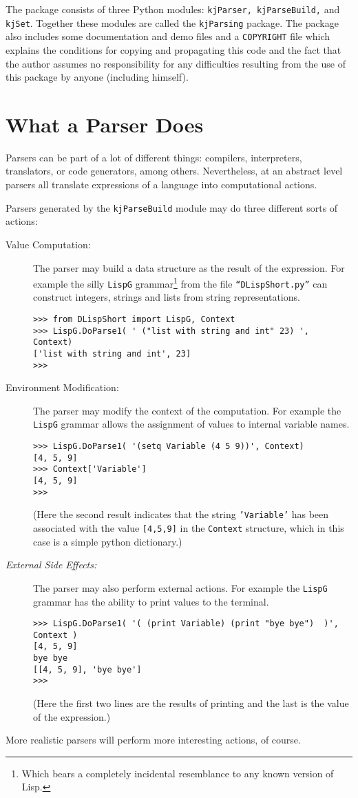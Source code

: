 The package consists of three Python modules:
{\tt kjParser, kjParseBuild,} and {\tt kjSet}.  Together these
modules are called the {\tt kjParsing} package.
The package also includes some documentation and demo
files and a {\tt COPYRIGHT} file which explains the
conditions for copying and propagating this code
and the fact that the author assumes no responsibility
for any difficulties resulting from the use of this
package by anyone (including himself).

\section{What a Parser Does}

Parsers can be part of a lot of different things:
compilers, interpreters, translators, or code generators,
among others.  Nevertheless, at an abstract level parsers
all translate expressions of a language into computational
actions.

Parsers generated by the {\tt kjParseBuild} module may do three
different sorts of actions: 
\begin{description}
\item[Value Computation:]
The parser may build a data structure
as the result of the expression.  For example the silly {\tt LispG}
grammar\footnote{Which
bears a completely incidental resemblance to any
known version of Lisp.}
from the file
{\tt ``DLispShort.py''} can construct integers, strings and
lists from string representations.
\begin{verbatim}
>>> from DLispShort import LispG, Context
>>> LispG.DoParse1( ' ("list with string and int" 23) ', Context)
['list with string and int', 23]
>>>
\end{verbatim}
\item[Environment Modification:]
The parser may modify the context of the computation.  For example
the {\tt LispG} grammar allows the assignment of values to internal
variable names.
\begin{verbatim}
>>> LispG.DoParse1( '(setq Variable (4 5 9))', Context)
[4, 5, 9]
>>> Context['Variable']
[4, 5, 9]
>>>
\end{verbatim}
(Here the second result indicates that the string {\tt 'Variable'}
has been associated with the value {\tt [4,5,9]} in
the {\tt Context} structure, which in this case is a simple
python dictionary.)
\item[\em External Side Effects:]
The parser may also perform external actions.  For example the
{\tt LispG} grammar has the ability to print values to the terminal.
\begin{verbatim}
>>> LispG.DoParse1( '( (print Variable) (print "bye bye")  )', Context )
[4, 5, 9]
bye bye
[[4, 5, 9], 'bye bye']
>>>
\end{verbatim}
(Here the first two lines are the results of printing
and the last is the value of the expression.)
\end{description}
More realistic parsers will perform more interesting actions,
of course.

